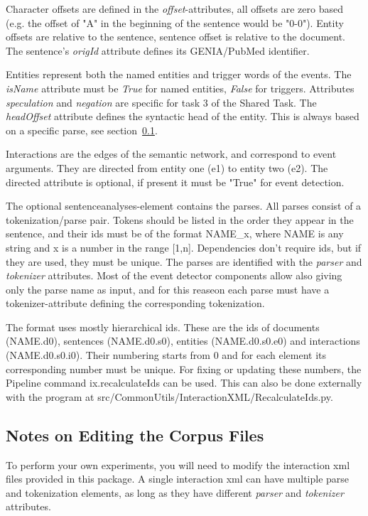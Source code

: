 \documentclass[a4paper,12pt]{article}
\begin{document}
Character offsets are defined in the \emph{offset}-attributes, all offsets are
zero based (e.g. the offset of "A" in the beginning of the sentence would be "0-0").
Entity offsets are relative to the sentence, sentence offset is relative to the
document. The sentence's \emph{origId} attribute defines its GENIA/PubMed
identifier.

Entities represent both the named entities and trigger words of the events. The
\emph{isName} attribute must be \emph{True} for named entities, \emph{False} for triggers.
Attributes \emph{speculation} and \emph{negation} are specific for task 3 of the Shared
Task. The \emph{headOffset} attribute defines the syntactic head of the entity. This
is always based on a specific parse, see section~\ref{sec-editing}.

Interactions are the edges of the semantic network, and correspond to event
arguments. They are directed from entity one (e1) to entity two (e2). The
directed attribute is optional, if present it must be "True" for event detection.

The optional sentenceanalyses-element contains the parses. All parses consist of
a tokenization/parse pair. Tokens should be listed in the order they appear in
the sentence, and their ids must be of the format NAME\_x, where NAME is any
string and x is a number in the range [1,n]. Dependencies don't require ids, but
if they are used, they must be unique. The parses are identified with the
\emph{parser} and \emph{tokenizer} attributes. Most of the event detector components
allow also giving only the parse name as input, and for this reaseon each parse must
have a tokenizer-attribute defining the corresponding tokenization.

The format uses mostly hierarchical ids. These are the ids of documents
(NAME.d0), sentences (NAME.d0.s0), entities (NAME.d0.s0.e0) and interactions
(NAME.d0.s0.i0). Their numbering starts from 0 and for each element its
corresponding number must be unique. For fixing or updating these numbers, the
Pipeline command ix.recalculateIds can be used. This can also be done
externally with the program at src/CommonUtils/InteractionXML/RecalculateIds.py.

\subsection{Notes on Editing the Corpus Files}
\label{sec-editing}

To perform your own experiments, you will need to modify the interaction xml
files provided in this package. A single interaction xml can have multiple parse
and tokenization elements, as long as they have different \emph{parser} and
\emph{tokenizer} attributes.
\end{document}
